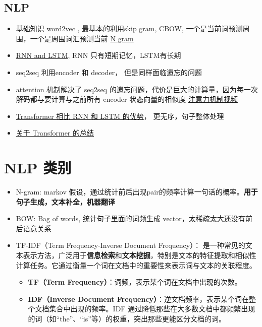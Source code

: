\documentclass[12pt]{article}
\numberwithin{theorem}{section} %
\numberwithin{definition}{section} %
\numberwithin{assumption}{section} %
\numberwithin{lemma}{section} %
\numberwithin{remark}{section} %
\numberwithin{prop}{section} %
\numberwithin{corollary}{section} %
\numberwithin{example}{section} %
\numberwithin{question}{section} %
\numberwithin{problem}{section} %
\numberwithin{conjecture}{section} %
\numberwithin{append}{section} %
\numberwithin{property}{section} %
\begin{document}
\begin{CJK}{UTF8}{gbsn}
\subsection{NLP}
\begin{itemize}
	\item 基础知识 \href{https://zhuanlan.zhihu.com/p/61635013}{word2vec} , 最基本的利用skip gram, CBOW, 一个是当前词预测周围，一个是周围词汇预测当前
	\href{https://zhuanlan.zhihu.com/p/32829048}{N gram}
	\item \href{https://blog.csdn.net/hfutdog/article/details/96479716}{RNN and LSTM}, RNN 只有短期记忆，LSTM有长期
	\item seq2seq 利用encoder 和 decoder， 但是同样面临遗忘的问题
	\item attention 机制解决了 seq2seq 的遗忘问题，代价是巨大的计算量，因为每一次解码都与要计算与之前所有 encoder 状态向量的相似度 \href{https://www.youtube.com/watch?v=XhWdv7ghmQQ&t=0s}{注意力机制视频}
	\item \href{https://blog.csdn.net/None_Pan/article/details/106485896}{Transformer 相比 RNN 和 LSTM 的优势}， 更无序，句子整体处理
	\item \href{https://www.zhihu.com/question/439243827}{关于 Transformer 的总结}
\end{itemize}

\section{NLP 类别}
\begin{itemize}
	\item N-gram:  markov 假设，通过统计前后出现pair的频率计算一句话的概率。\textbf{用于句子生成，文本补全，机器翻译}
	\item BOW:  Bag of words, 统计句子里面的词频生成 vector，太稀疏太大还没有前后语意关系
	\item TF-IDF（Term Frequency-Inverse Document Frequency）： 是一种常见的文本表示方法，广泛用于\textbf{信息检索}和\textbf{文本挖掘}，特别是文本的特征提取和相似性计算任务。它通过衡量一个词在文档中的重要性来表示词与文本的关联程度。
		
		\begin{itemize}
			\item \textbf{TF（Term Frequency）}：词频，表示某个词在文档中出现的次数。
			\item \textbf{IDF（Inverse Document Frequency）}：逆文档频率，表示某个词在整个文档集合中出现的频率。IDF 通过降低那些在大多数文档中都频繁出现的词（如“the”、“is”等）的权重，突出那些更能区分文档的词。
		\end{itemize}
		

\end{itemize}
\end{CJK}
\end{document}
